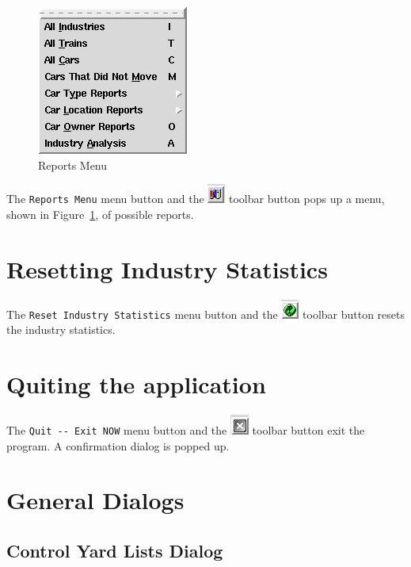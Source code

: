 \begin{figure}[hbpt]
\begin{centering}
\includegraphics{FCFReportsMenu.png}
\caption{Reports Menu}
\label{fig:fcf:reportsmenu}
\end{centering}
\end{figure}
The \verb=Reports Menu= menu button and the
\includegraphics{FCFReportsTool.png} toolbar button pops up a menu,
shown in Figure~\ref{fig:fcf:reportsmenu}, of
possible reports.

\section{Resetting Industry Statistics}

The \verb=Reset Industry Statistics= menu button and the
\includegraphics{FCFResetStatsTool.png} toolbar button resets the
industry statistics.

\section{Quiting the application}

The \verb=Quit -- Exit NOW= menu button and the
\includegraphics{FCFCloseTool.png} toolbar button exit the program. A
confirmation dialog is popped up.


\section{General Dialogs}

\subsection{Control Yard Lists Dialog}

